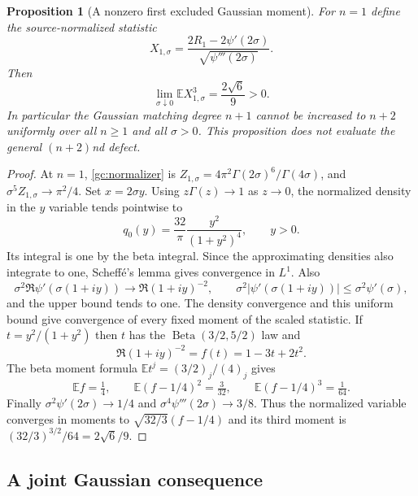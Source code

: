 \documentclass[11pt,a4paper]{article}
\numberwithin{equation}{section}
\newtheorem{proposition}[theorem]{Proposition}
\theoremstyle{definition}
\theoremstyle{remark}
\begin{document}
\begin{proposition}[A nonzero first excluded Gaussian moment]
\label{gc:sharpness}
For $n=1$ define the source-normalized statistic
\[
 X_{1,\sigma}=\frac{2R_1-2\psi'(2\sigma)}
                         {\sqrt{\psi'''(2\sigma)}}.
\]
Then
\begin{equation}\label{gc:skewlimit}
        \lim_{\sigma\downarrow0}\mathbb E X_{1,\sigma}^3
                       =\frac{2\sqrt6}{9}>0.
\end{equation}
In particular the Gaussian matching degree $n+1$ cannot be increased
to $n+2$ uniformly over all $n\ge1$ and all $\sigma>0$.
This proposition does not evaluate the general $(n+2)$nd defect.
\end{proposition}
\begin{proof}
At $n=1$, \eqref{gc:normalizer} is
$Z_{1,\sigma}=4\pi^2\Gamma(2\sigma)^6/\Gamma(4\sigma)$,
and $\sigma^5 Z_{1,\sigma}\to\pi^2/4$.
Set $x=2\sigma y$. Using $z\Gamma(z)\to1$ as $z\to0$, the
normalized density in the $y$ variable tends pointwise to
\[
                q_0(y)=\frac{32}{\pi}\frac{y^2}{(1+y^2)^4},
                \qquad y>0.
\]
Its integral is one by the beta integral. Since the approximating
densities also integrate to one, Scheff\'e's lemma gives convergence
in $L^1$. Also
\[
 \sigma^2\Re\psi'(\sigma(1+iy))
       \longrightarrow\Re(1+iy)^{-2},\qquad
 \sigma^2|\psi'(\sigma(1+iy))|
       \le\sigma^2\psi'(\sigma),
\]
and the upper bound tends to one. The density convergence and this
uniform bound give convergence of every fixed moment of the scaled
statistic. If $t=y^2/(1+y^2)$ then $t$ has the
$\operatorname{Beta}(3/2,5/2)$ law and
\[
 \Re(1+iy)^{-2}=f(t)=1-3t+2t^2.
\]
The beta moment formula
$\mathbb Et^j=(3/2)_j/(4)_j$ gives
\[
 \mathbb Ef=\tfrac14,\qquad
 \mathbb E(f-1/4)^2=\tfrac3{32},\qquad
 \mathbb E(f-1/4)^3=\tfrac1{64}.
\]
Finally $\sigma^2\psi'(2\sigma)\to1/4$ and
$\sigma^4\psi'''(2\sigma)\to3/8$. Thus the normalized variable
converges in moments to $\sqrt{32/3}(f-1/4)$ and its third moment
is $(32/3)^{3/2}/64=2\sqrt6/9$.
\end{proof}

\subsection{A joint Gaussian consequence}
\end{document}
